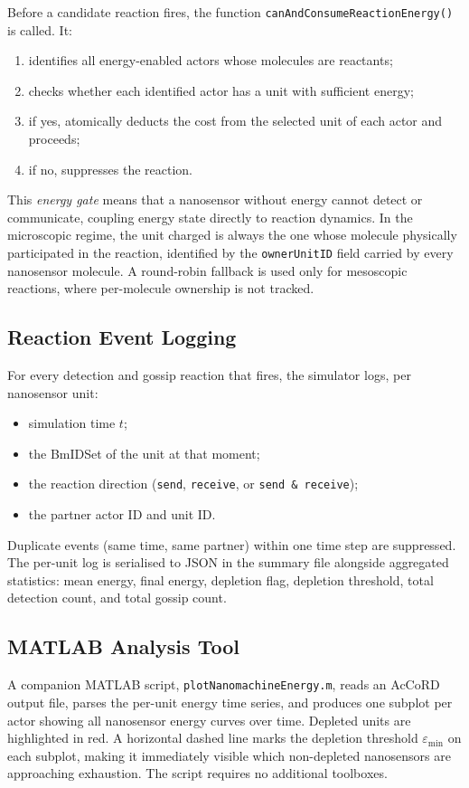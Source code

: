 \documentclass[journal]{IEEEtran}
\begin{document}
Before a candidate reaction fires, the function
\texttt{canAndConsumeReactionEnergy()} is called. It:
\begin{enumerate}
  \item identifies all energy-enabled actors whose molecules are reactants;
  \item checks whether each identified actor has a unit with sufficient energy;
  \item if yes, atomically deducts the cost from the selected unit of each
        actor and proceeds;
  \item if no, suppresses the reaction.
\end{enumerate}
This \emph{energy gate} means that a nanosensor without energy cannot detect
or communicate, coupling energy state directly to reaction dynamics. In the
microscopic regime, the unit charged is always the one whose molecule physically
participated in the reaction, identified by the \texttt{ownerUnitID} field
carried by every nanosensor molecule. A round-robin fallback is used only for
mesoscopic reactions, where per-molecule ownership is not tracked.

\subsection{Reaction Event Logging}

For every detection and gossip reaction that fires, the simulator logs, per
nanosensor unit:
\begin{itemize}
  \item simulation time $t$;
  \item the BmIDSet of the unit at that moment;
  \item the reaction direction (\texttt{send}, \texttt{receive}, or
        \texttt{send \& receive});
  \item the partner actor ID and unit ID.
\end{itemize}
Duplicate events (same time, same partner) within one time step are suppressed.
The per-unit log is serialised to JSON in the summary file alongside aggregated
statistics: mean energy, final energy, depletion flag, depletion threshold,
total detection count, and total gossip count.

\subsection{MATLAB Analysis Tool}

A companion MATLAB script, \texttt{plotNanomachineEnergy.m}, reads an AcCoRD
output file, parses the per-unit energy time series, and produces one subplot
per actor showing all nanosensor energy curves over time. Depleted units are
highlighted in red. A horizontal dashed line marks the depletion threshold
$\varepsilon_\mathrm{min}$ on each subplot, making it immediately visible which
non-depleted nanosensors are approaching exhaustion. The script requires no
additional toolboxes.
\end{document}
